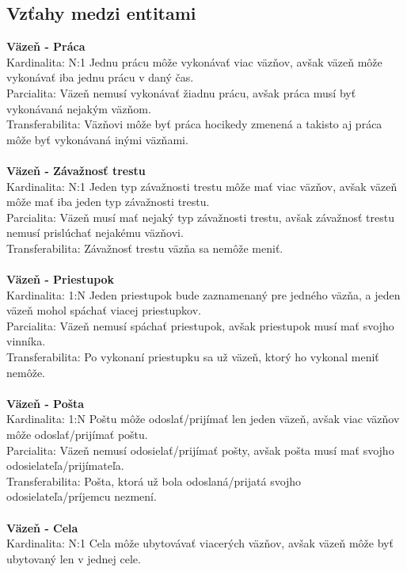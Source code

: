 \documentclass[slovak, 12pt, Times New Roman]{article}
\begin{document}
		\subsection{Vzťahy medzi entitami}
			\textbf{Väzeň - Práca} \\
				Kardinalita: N:1 Jednu prácu môže vykonávať viac väzňov, avšak väzeň môže vykonávať iba jednu prácu v daný čas.\\
				Parcialita: Väzeň nemusí vykonávať žiadnu prácu, avšak práca musí byť vykonávaná nejakým väzňom.\\ 
				Transferabilita: Väzňovi môže byť práca hocikedy zmenená a takisto aj práca môže byť vykonávaná inými väzňami.\\ \\
			\textbf{Väzeň - Závažnosť trestu} \\
				Kardinalita: N:1 Jeden typ závažnosti trestu môže mať viac väzňov, avšak väzeň môže mať iba jeden typ závažnosti trestu. \\
				Parcialita: Väzeň musí mať nejaký typ závažnosti trestu, avšak závažnosť trestu nemusí prislúchať nejakému väzňovi.\\ 
				Transferabilita: Závažnosť trestu väzňa sa nemôže meniť.\\ \\
			\textbf{Väzeň - Priestupok} \\
				Kardinalita: 1:N Jeden priestupok bude zaznamenaný pre jedného väzňa, a jeden väzeň mohol spáchať viacej priestupkov.
				\\
				Parcialita: Väzeň nemusí spáchať priestupok, avšak priestupok musí mať svojho vinníka.\\ 
				Transferabilita: Po vykonaní priestupku sa už väzeň, ktorý ho vykonal meniť nemôže.\\ \\
			\textbf{Väzeň - Pošta} \\
				Kardinalita: 1:N Poštu môže odoslať/prijímať len jeden väzeň, avšak viac väzňov môže odoslať/prijímať poštu.\\
				Parcialita: Väzeň nemusí odosielať/prijímať pošty, avšak pošta musí mať svojho odosielateľa/prijímateľa.\\ 
				Transferabilita: Pošta, ktorá už bola odoslaná/prijatá svojho odosielateľa/príjemcu nezmení.\\ \\
			\textbf{Väzeň - Cela} \\
				Kardinalita: N:1 Cela môže ubytovávať viacerých väzňov, avšak väzeň môže byť ubytovaný len v jednej cele. \\
\end{document}
